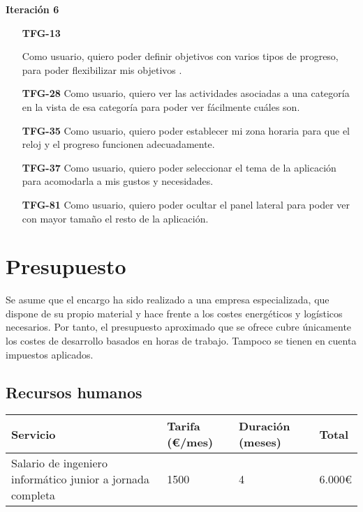 \documentclass[10pt, a4paper]{aqademic}
\begin{document}
\textbf{Iteración 6}
\begin{itemize}[leftmargin=16mm]
	\item [\textbf{TFG-13}]  	
	
	Como usuario, quiero poder definir objetivos con varios tipos de progreso, para poder flexibilizar mis objetivos .
	
	\item [\textbf{TFG-28}] Como usuario, quiero ver las actividades asociadas a una categoría en la vista de esa categoría para poder ver fácilmente cuáles son.
	
	\item [\textbf{TFG-35}] Como usuario, quiero poder establecer mi zona horaria para que el reloj y el progreso funcionen adecuadamente.
	
	\item [\textbf{TFG-37}] Como usuario, quiero poder seleccionar el tema de la aplicación para acomodarla a mis gustos y necesidades.
	
	\item [\textbf{TFG-81}] Como usuario, quiero poder ocultar el panel lateral para poder ver con mayor tamaño el resto de la aplicación.
\end{itemize}


\section{Presupuesto}

Se asume que el encargo ha sido realizado a una empresa especializada, que dispone de su propio material y 
hace frente a los costes energéticos y logísticos necesarios. Por tanto, el presupuesto aproximado que se ofrece cubre únicamente los costes
de desarrollo basados en horas de trabajo. Tampoco se tienen en cuenta impuestos aplicados.

\subsection*{Recursos humanos}

\begin{table}[h!]
	\begin{center}
		\begin{tabular}{|l|l|l|l|}
			\hline
			\rowcolor[HTML]{EFEFEF} 
			\textbf{Servicio}                   & \textbf{Tarifa (€/mes)} & \textbf{Duración (meses)} & \textbf{Total}              \\ \hline
			Salario de ingeniero informático junior a jornada completa & 1500       & 4          & \multicolumn{1}{r|}{6.000€} \\ \hline
		\end{tabular}
	\end{center}
\end{table}
\end{document}
